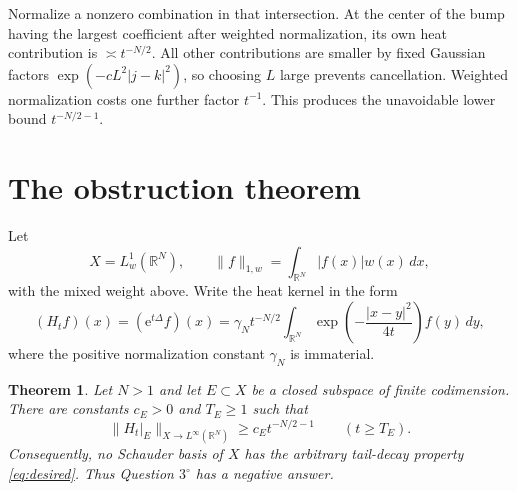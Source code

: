 \documentclass[11pt]{article}
\newtheorem{theorem}{Theorem}
\newcommand{\R}{\mathbb{R}}
\newcommand{\e}{\mathrm{e}}
\begin{document}
Normalize a nonzero combination in that intersection.  At the center of the
bump having the largest coefficient after weighted normalization, its own
heat contribution is $\asymp t^{-N/2}$.  All other contributions are smaller
by fixed Gaussian factors $\exp(-cL^2|j-k|^2)$, so choosing $L$ large prevents
cancellation.  Weighted normalization costs one further factor $t^{-1}$.
This produces the unavoidable lower bound $t^{-N/2-1}$.

\section{The obstruction theorem}

Let
\[
 X=L^1_w(\R^N),\qquad
 \|f\|_{1,w}=\int_{\R^N}|f(x)|w(x)\,dx,
\]
with the mixed weight above.  Write the heat kernel in the form
\[
 (H_tf)(x)=(\e^{t\Delta}f)(x)
 =\gamma_N t^{-N/2}\int_{\R^N}
   \exp\!\left(-\frac{|x-y|^2}{4t}\right)f(y)\,dy,
\]
where the positive normalization constant $\gamma_N$ is immaterial.

\begin{theorem}\label{thm:main}
Let $N>1$ and let $E\subset X$ be a closed subspace of finite codimension.
There are constants $c_E>0$ and $T_E\ge1$ such that
\[
 \|H_t|_E\|_{X\to L^\infty(\R^N)}
 \ge c_E t^{-N/2-1}
 \qquad (t\ge T_E).
\]
Consequently, no Schauder basis of $X$ has the arbitrary tail-decay property
\eqref{eq:desired}.  Thus Question $3^\circ$ has a negative answer.
\end{theorem}
\end{document}
